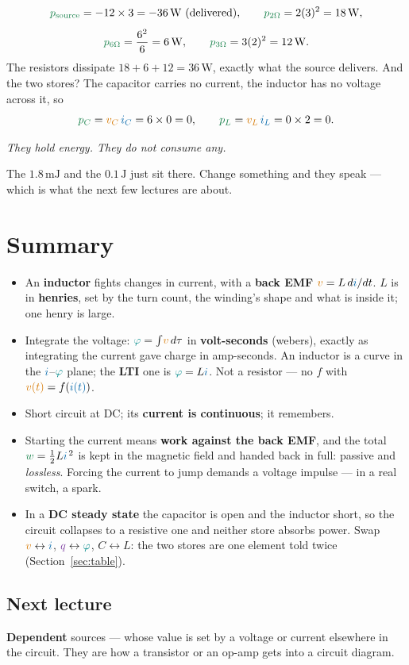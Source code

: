 \documentclass[11pt,a4paper]{article}
\newcommand{\Icol}[1]{\textcolor{ccur}{#1}}
\newcommand{\Vcol}[1]{\textcolor{cvolt}{#1}}
\newcommand{\Pcol}[1]{\textcolor{cpow}{#1}}
\newcommand{\Qcol}[1]{\textcolor{ccharge}{#1}}
\newcommand{\Fcol}[1]{\textcolor{cflux}{#1}}
\newcommand{\uni}[1]{\,\mathrm{#1}}
\newcommand{\W}{\uni{W}}   \newcommand{\J}{\uni{J}}
\begin{document}
\begin{examplebox}
\[
  \Pcol{p_{\text{source}}} = -12 \times 3 = -36\W \ \text{(delivered)}, \qquad
  \Pcol{p_{2\Omega}} = 2(3)^2 = 18\W ,
\]
\vspace{-14pt}
\[
  \Pcol{p_{6\Omega}} = \frac{6^2}{6} = 6\W , \qquad
  \Pcol{p_{3\Omega}} = 3(2)^2 = 12\W .
\]
The resistors dissipate $18 + 6 + 12 = 36\W$, exactly what the source delivers. And the
two stores? The capacitor carries no current, the inductor has no voltage across it, so
\[
  \Pcol{p_C} = \Vcol{v_C}\,\Icol{i_C} = 6 \times 0 = 0 , \qquad
  \Pcol{p_L} = \Vcol{v_L}\,\Icol{i_L} = 0 \times 2 = 0 .
\]
\begin{center}
\emph{They hold energy. They do not consume any.}
\end{center}
The $1.8\uni{mJ}$ and the $0.1\J$ just sit there. Change something and they speak --- which
is what the next few lectures are about.
\end{examplebox}

\section*{Summary}

\begin{itemize}
  \item An \textbf{inductor} fights changes in current, with a \textbf{back EMF}
        $\Vcol{v} = L\,d\Icol{i}/dt$. $L$ is in \textbf{henries}, set by the turn count,
        the winding's shape and what is inside it; one henry is large.
  \item Integrate the voltage: $\Fcol{\varphi} = \int\!\Vcol{v}\,d\tau$ in
        \textbf{volt-seconds} (webers), exactly as integrating the current gave charge in
        amp-seconds. An inductor is a curve in the $\Icol{i}$--$\Fcol{\varphi}$ plane; the
        \textbf{LTI} one is $\Fcol{\varphi} = L\Icol{i}$. Not a resistor --- no $f$ with
        $\Vcol{v(t)} = f(\Icol{i(t)})$.
  \item Short circuit at DC; its \textbf{current is continuous}; it remembers.
  \item Starting the current means \textbf{work against the back EMF}, and the total
        $\Pcol{w} = \tfrac12 L\Icol{i}^{\,2}$ is kept in the magnetic field and handed
        back in full: passive and \emph{lossless}. Forcing the current to jump demands a
        voltage impulse --- in a real switch, a spark.
  \item In a \textbf{DC steady state} the capacitor is open and the inductor short, so the
        circuit collapses to a resistive one and neither store absorbs power. Swap
        $\Vcol{v}\leftrightarrow\Icol{i}$, $\Qcol{q}\leftrightarrow\Fcol{\varphi}$,
        $C\leftrightarrow L$: the two stores are one element told twice
        (Section~\ref{sec:table}).
\end{itemize}

\subsection*{Next lecture}
\textbf{Dependent} sources --- whose value is set by a voltage or current elsewhere in the
circuit. They are how a transistor or an op-amp gets into a circuit diagram.
\end{document}
